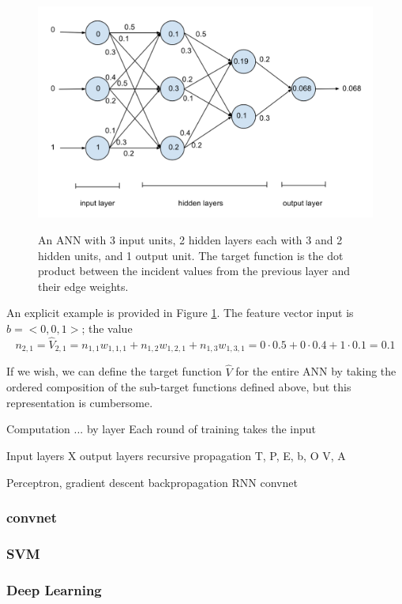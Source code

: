 \documentclass[12pt]{article}  %
\begin{document}
\begin{figure}
\centering
\includegraphics[scale=0.5]{images/ANN.png}\\
\caption{An ANN with 3 input units, 2 hidden layers each with 3 and 2 hidden units, and 1 output unit. The target function is the dot product between the incident values from the previous layer and their edge weights.}\label{ANN-fig}
\end{figure}

An explicit example is provided in Figure \ref{ANN-fig}. The feature vector input is $b = <0,0,1>$; the value $$n_{2,1} = \hat{V}_{2,1} = n_{1,1}w_{1,1,1} + n_{1,2}w_{1,2,1} + n_{1,3}w_{1,3,1} = 0 \cdot 0.5 + 0 \cdot 0.4 + 1 \cdot 0.1 = 0.1$$

If we wish, we can define the target function $\hat{V}$ for the entire ANN by taking the ordered composition of the sub-target functions defined above, but this representation is cumbersome.


Computation ... by layer
Each round of training takes the input 


Input layers X
output layers
recursive propagation
T, P, E, b, O
V, A

Perceptron,
gradient descent
backpropagation
RNN
convnet


\subsubsection{convnet}
\subsubsection{SVM}
\subsubsection{Deep Learning}
\end{document}
